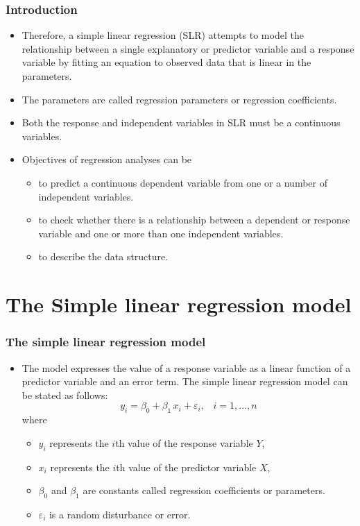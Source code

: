 \documentclass{beamer}
\begin{document}
\begin{frame}\frametitle{Introduction}
\begin{itemize}
\item Therefore, a simple linear regression (SLR) attempts to model the relationship between a single explanatory or predictor variable and a response variable by fitting an equation to observed data that is linear in the parameters.
\item The parameters are called regression parameters or regression coefficients.
\item Both the response and independent variables in SLR must be a continuous variables.
\item Objectives of regression analyses can be
   \begin{itemize}
       \item to predict a continuous dependent variable from one or a number of independent variables.
       \item to check whether there is a relationship between a dependent or response variable and one or more than one independent variables.
       \item to describe the data structure.
   \end{itemize}
\end{itemize}
\end{frame}


\section{The Simple linear regression model}
\begin{frame}\frametitle{The simple linear regression model}
\begin{itemize}
\item The model expresses the value of a response variable as a linear function of a predictor variable and an error term. The simple linear regression model can be stated as follows:
\begin{equation}
y_i = \beta_0 + \beta_1\,x_i + \varepsilon_i,  \;\;\; i=1,...,n
\end{equation}
where
\begin{itemize}
\item $y_i$ represents the $i$th value of the response variable $Y$,
\item $x_i$ represents the $i$th value of the predictor variable $X$,
\item $\beta_0$ and $\beta_1$ are constants called regression coefficients or parameters.
\item $\varepsilon_i$ is a random disturbance or error.
\end{itemize}
\end{itemize}
\end{frame}
\end{document}
